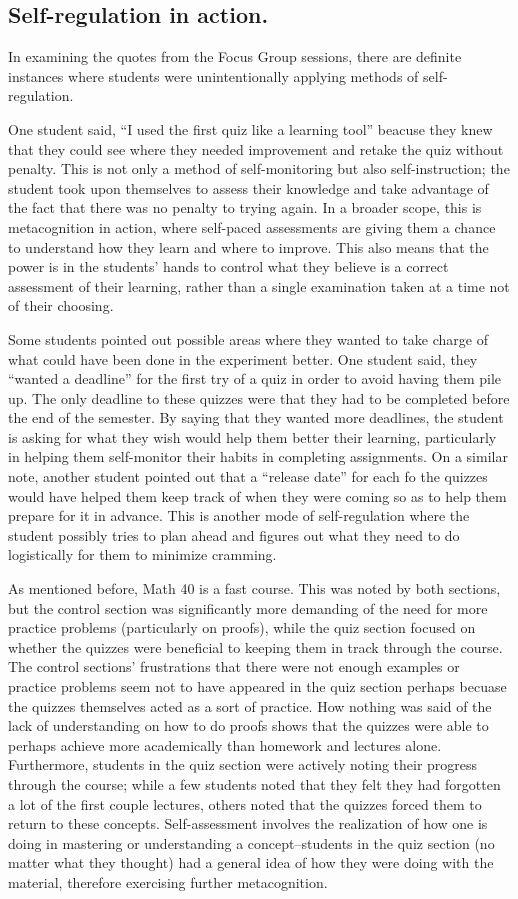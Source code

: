 \subsection{Self-regulation in action.}
In examining the quotes from the Focus Group sessions, there are definite instances where students were unintentionally applying methods of self-regulation.

One student said, ``I used the first quiz like a learning tool'' beacuse they knew that they could see where they needed improvement and retake the quiz without penalty. This is not only a method of self-monitoring but also self-instruction; the student took upon themselves to assess their knowledge and take advantage of the fact that there was no penalty to trying again. In a broader scope, this is metacognition in action, where self-paced assessments are giving them a chance to understand how they learn and where to improve. This also means that the power is in the students' hands to control what they believe is a correct assessment of their learning, rather than a single examination taken at a time not of their choosing.

Some students pointed out possible areas where they wanted to take charge of what could have been done in the experiment better. One student said, they ``wanted a deadline'' for the first try of a quiz in order to avoid having them pile up. The only deadline to these quizzes were that they had to be completed before the end of the semester. By saying that they wanted more deadlines, the student is asking for what they wish would help them better their learning, particularly in helping them self-monitor their habits in completing assignments. On a similar note, another student pointed out that a ``release date'' for each fo the quizzes would have helped them keep track of when they were coming so as to help them prepare for it in advance. This is another mode of self-regulation where the student possibly tries to plan ahead and figures out what they need to do logistically for them to minimize cramming.

As mentioned before, Math 40 is a fast course. This was noted by both sections, but the control section was significantly more demanding of the need for more practice problems (particularly on proofs), while the quiz section focused on whether the quizzes were beneficial to keeping them in track through the course. The control sections' frustrations that there were not enough examples or practice problems seem not to have appeared in the quiz section perhaps becuase the quizzes themselves acted as a sort of practice. How nothing was said of the lack of understanding on how to do proofs shows that the quizzes were able to perhaps achieve more academically than homework and lectures alone. Furthermore, students in the quiz section were actively noting their progress through the course; while a few students noted that they felt they had forgotten a lot of the first couple lectures, others noted that the quizzes forced them to return to these concepts. Self-assessment involves the realization of how one is doing in mastering or understanding a concept--students in the quiz section (no matter what they thought) had a general idea of how they were doing with the material, therefore exercising further metacognition.

